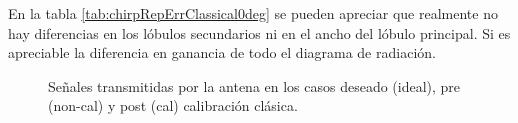 En la tabla \ref{tab:chirpRepErrClassical0deg} se pueden apreciar que realmente no hay diferencias en los lóbulos secundarios 
ni en el ancho del lóbulo principal. Si es apreciable la diferencia en ganancia de todo el diagrama de radiación.

\begin{figure}[H]
	\centering

	\caption{Señales transmitidas por la antena en los casos deseado (ideal), pre (non-cal) y post (cal) calibración clásica.}
	\label{fig:chirpRepErrClassical0deg}
\end{figure}

